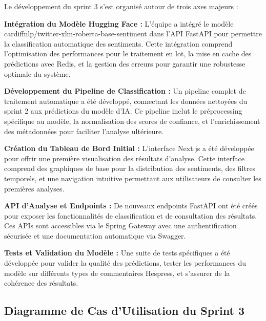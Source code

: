 Le développement du sprint 3 s'est organisé autour de trois axes majeurs :

\textbf{Intégration du Modèle Hugging Face :} L'équipe a intégré le modèle cardiffnlp/twitter-xlm-roberta-base-sentiment dans l'API FastAPI pour permettre la classification automatique des sentiments. Cette intégration comprend l'optimisation des performances pour le traitement en lot, la mise en cache des prédictions avec Redis, et la gestion des erreurs pour garantir une robustesse optimale du système.

\textbf{Développement du Pipeline de Classification :} Un pipeline complet de traitement automatique a été développé, connectant les données nettoyées du sprint 2 aux prédictions du modèle d'IA. Ce pipeline inclut le préprocessing spécifique au modèle, la normalisation des scores de confiance, et l'enrichissement des métadonnées pour faciliter l'analyse ultérieure.

\textbf{Création du Tableau de Bord Initial :} L'interface Next.js a été développée pour offrir une première visualisation des résultats d'analyse. Cette interface comprend des graphiques de base pour la distribution des sentiments, des filtres temporels, et une navigation intuitive permettant aux utilisateurs de consulter les premières analyses.

\textbf{API d'Analyse et Endpoints :} De nouveaux endpoints FastAPI ont été créés pour exposer les fonctionnalités de classification et de consultation des résultats. Ces APIs sont accessibles via le Spring Gateway avec une authentification sécurisée et une documentation automatique via Swagger.

\textbf{Tests et Validation du Modèle :} Une suite de tests spécifiques a été développée pour valider la qualité des prédictions, tester les performances du modèle sur différents types de commentaires Hespress, et s'assurer de la cohérence des résultats.

\subsection{Diagramme de Cas d'Utilisation du Sprint 3}


